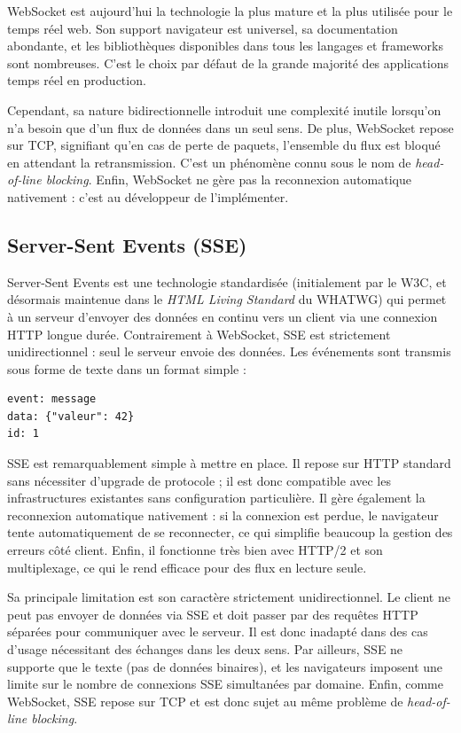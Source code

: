 WebSocket est aujourd'hui la technologie la plus mature et la plus utilisée pour le temps réel web. Son support navigateur est universel, sa documentation abondante, et les bibliothèques disponibles dans tous les langages et frameworks sont nombreuses. C'est le choix par défaut de la grande majorité des applications temps réel en production.

Cependant, sa nature bidirectionnelle introduit une complexité inutile lorsqu'on n'a besoin que d'un flux de données dans un seul sens. De plus, WebSocket repose sur TCP, signifiant qu'en cas de perte de paquets, l'ensemble du flux est bloqué en attendant la retransmission. C'est un phénomène connu sous le nom de \textit{head-of-line blocking}. Enfin, WebSocket ne gère pas la reconnexion automatique nativement : c'est au développeur de l'implémenter.

\subsection{Server-Sent Events (SSE)}

Server-Sent Events est une technologie standardisée (initialement par le W3C, et désormais maintenue dans le \textit{HTML Living Standard} du WHATWG) qui permet à un serveur d'envoyer des données en continu vers un client via une connexion HTTP longue durée. Contrairement à WebSocket, SSE est strictement unidirectionnel : seul le serveur envoie des données. Les événements sont transmis sous forme de texte dans un format simple :

\begin{lstlisting}
event: message
data: {"valeur": 42}
id: 1
\end{lstlisting}

SSE est remarquablement simple à mettre en place. Il repose sur HTTP standard sans nécessiter d'upgrade de protocole ; il est donc compatible avec les infrastructures existantes sans configuration particulière. Il gère également la reconnexion automatique nativement : si la connexion est perdue, le navigateur tente automatiquement de se reconnecter, ce qui simplifie beaucoup la gestion des erreurs côté client. Enfin, il fonctionne très bien avec HTTP/2 et son multiplexage, ce qui le rend efficace pour des flux en lecture seule.

Sa principale limitation est son caractère strictement unidirectionnel. Le client ne peut pas envoyer de données via SSE et doit passer par des requêtes HTTP séparées pour communiquer avec le serveur. Il est donc inadapté dans des cas d'usage nécessitant des échanges dans les deux sens. Par ailleurs, SSE ne supporte que le texte (pas de données binaires), et les navigateurs imposent une limite sur le nombre de connexions SSE simultanées par domaine. Enfin, comme WebSocket, SSE repose sur TCP et est donc sujet au même problème de \textit{head-of-line blocking}.

